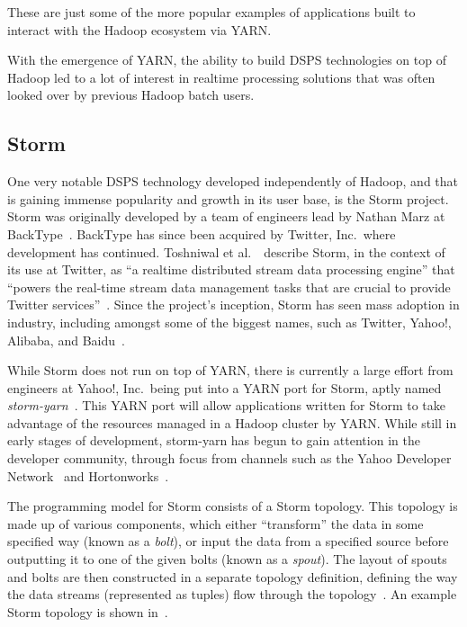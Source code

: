 These are just some of the more popular examples of applications built to interact with the Hadoop ecosystem via YARN.

With the emergence of YARN, the ability to build DSPS technologies on top of Hadoop led to a lot of interest in realtime
processing solutions that was often looked over by previous Hadoop batch users.



\subsection{Storm} %
\label{ssub:storm}

One very notable DSPS technology developed independently of Hadoop, and that is gaining immense popularity and growth in its
user base, is the Storm project. Storm was originally developed by a team of engineers lead by Nathan Marz at
BackType~\cite{web_storm}. BackType has since been acquired by Twitter, Inc.\ where development has
continued. Toshniwal et al.~\cite{toshniwal_stormtwitter_2014}\ describe Storm, in the context of its use at Twitter, as ``a
realtime distributed stream data processing engine'' that ``powers the real-time stream data management tasks that are
crucial to provide Twitter services''~\cite[p.\ 147]{toshniwal_stormtwitter_2014}. Since the project's inception, Storm has seen mass
adoption in industry, including amongst some of the biggest names, such as Twitter, Yahoo!, Alibaba, and
Baidu~\cite{storm_users}.

While Storm does not run on top of YARN, there is currently a large effort from engineers at Yahoo!, Inc.\ being put
into a YARN port for Storm, aptly named \textit{storm-yarn}~\cite{web_storm_yarn,kumar2014architectural}. This YARN port will
allow applications written for Storm to take advantage of the resources managed in a Hadoop cluster by YARN. While still
in early stages of development, storm-yarn has begun to gain attention in the developer community, through focus from
channels such as the Yahoo Developer Network~\cite{web_yahoo_blog} and Hortonworks~\cite{web_hortonworks_blog}.

The programming model for Storm consists of a Storm topology. This topology is made up of various components, which
either ``transform'' the data in some specified way (known as a \textit{bolt}), or input the data from a specified source
before outputting it to one of the given bolts (known as a \textit{spout}). The layout of spouts and bolts are then
constructed in a separate topology definition, defining the way the data streams (represented as tuples) flow through
the topology~\cite{jones2013process}. An example Storm topology is shown in~.

